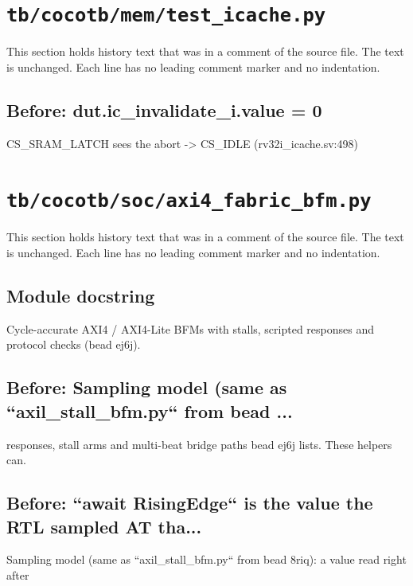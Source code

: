 \section{\texttt{tb/cocotb/mem/test\_icache.py}}\label{cr:suite:mem-test-icache}

This section holds history text that was in a comment of the source file. The text is unchanged. Each line has no leading comment marker and no indentation.

\begin{record}

\subsection*{Before: dut.ic\_invalidate\_i.value = 0}

\begin{textblock}
CS_SRAM_LATCH sees the abort -> CS_IDLE (rv32i_icache.sv:498)
\end{textblock}

\end{record}

\section{\texttt{tb/cocotb/soc/axi4\_fabric\_bfm.py}}\label{cr:suite:soc-axi4-fabric-bfm}

This section holds history text that was in a comment of the source file. The text is unchanged. Each line has no leading comment marker and no indentation.

\begin{record}

\subsection*{Module docstring}

\begin{textblock}
Cycle-accurate AXI4 / AXI4-Lite BFMs with stalls, scripted responses and protocol checks (bead ej6j).
\end{textblock}

\subsection*{Before: Sampling model (same as ``axil\_stall\_bfm.py`` from bead ...}

\begin{textblock}
responses, stall arms and multi-beat bridge paths bead ej6j lists.  These helpers can.
\end{textblock}

\subsection*{Before: ``await RisingEdge`` is the value the RTL sampled AT tha...}

\begin{textblock}
Sampling model (same as ``axil_stall_bfm.py`` from bead 8riq): a value read right after
\end{textblock}

\end{record}

